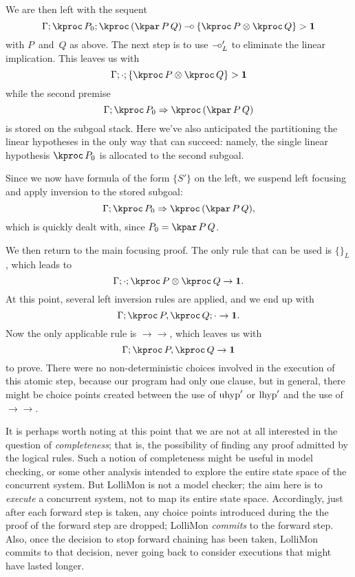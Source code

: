 \documentclass{sig-alt}
\begin{document}
We are then left with the sequent
$$
  \CLFLLFseq{\Gamma}{\kproc\,P_0}{\kproc\,(\kpar\,P\,Q)
    \limp \{\kproc\,P \tensor \kproc\,Q\}}{\one}
$$
with $P$~and~$Q$ as above. The next step is to use $\mathbin{-\hspace{-0.70mm}\circ}'_L$ to
eliminate the linear implication.  This leaves us with
$$
  \CLFLLFseq{\Gamma}{\cdot}{\{\kproc\,P \tensor \kproc\,Q\}}{\one}\\
$$ 
%
while the second premise
$$
  \CLFRIseq{\Gamma}{\kproc\,P_0}{\kproc\,(\kpar\,P\,Q)}
$$
%
is stored on the subgoal stack.  Here we've also anticipated the
partitioning the linear hypotheses in the only way that
can succeed: namely, the single linear hypothesis $\kproc\,P_0$ is
allocated to the second subgoal.

Since we now have formula of the form $\{S'\}$ on the left, we suspend
left focusing and apply inversion
to the stored subgoal:
$$
  \CLFRIseq{\Gamma}{\kproc\,P_0}{\kproc\,(\kpar\,P\,Q)},
$$
%
which is quickly dealt with, since $P_0=\kpar\,P\,Q$.  

We then return to the main focusing proof.  The only rule that can be
used is $\{\}_L$, which leads to
$$
  \CLFLIseq{\Gamma}{\cdot}{\kproc\,P\tensor\kproc\,Q}{\one}.
$$
At this point, several left inversion rules
are applied, and we end up with
$$
  \CLFLIseq{\Gamma}{\kproc\,P, \kproc\,Q}{\cdot}{\one}.
$$
%
Now the only applicable rule is $\rightarrow\rightarrow$, which leaves us with
$$
  \CLFLseq{\Gamma}{\kproc\,P, \kproc\,Q}{\one}
$$
%
to prove.  There were no non-deterministic choices involved in the
execution of this atomic step, because our program had only one
clause, but in general, there might be choice points created between
the use of $\hbox{uhyp}'$ or $\hbox{lhyp}'$ and the use of
$\rightarrow\rightarrow$.

It is perhaps worth noting at this point that we are not at all
interested in the question of \emph{completeness}; that is, the
possibility of finding any proof admitted by the logical rules.  Such
a notion of completeness might be useful in model checking, or some
other analysis intended to explore the entire state space of the
concurrent system.  But LolliMon is not a model checker; the aim here
is to \emph{execute} a concurrent system, not to map its entire state
space.  Accordingly, just after each forward step is taken, any choice
points introduced during the the proof of the forward step are
dropped; LolliMon \emph{commits} to the forward step. Also, once the
decision to stop forward chaining has been taken, LolliMon commits to
that decision, never going back to consider executions that might have
lasted longer.
\end{document}
